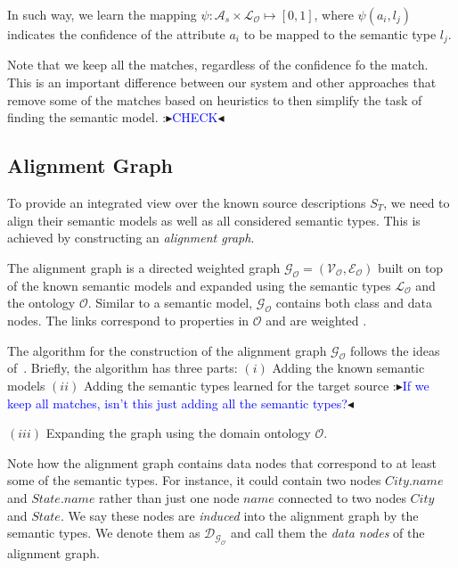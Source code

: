 \documentclass[letterpaper]{article} %
\newcommand{\authornote}[3]{
  {\fbox{\sc 
  #1}:$\blacktriangleright$\textcolor{#2}{\small{#3}}$\blacktriangleleft$}%
}
\newcommand{\ddg}[1]{\authornote{DDG}{blue}{#1}}
\newcommand{\npr}[1]{\authornote{NPR}{orange}{#1}}
\begin{document}
In such way, we learn the mapping $\psi : \mathcal{A}_s \times \mathcal{L_O} 
\mapsto [0, 1]$,
where $\psi(a_i,l_j)$ indicates the confidence of the attribute $a_i$ to be 
mapped to the semantic type $l_j$.

Note that we keep all the matches, regardless of the confidence fo the match. 
This is an important difference between our system and other approaches 
\cite{taheriyan2016learning} that 
remove some of the matches based on heuristics to then simplify the task of 
finding the semantic model. \ddg{CHECK}



\subsection{Alignment Graph}

To provide an integrated view over the known source descriptions $S_T$, we 
need to align their semantic models as well as all considered semantic 
types. 
This is achieved by constructing an \emph{alignment graph}. 

The alignment graph is a directed weighted graph $\mathcal{G_O} = 
(\mathcal{V_O},\mathcal{E_O})$ built on top 
of the known semantic models and expanded using the semantic types 
$\mathcal{L_O}$ and the ontology $\mathcal{O}$. 
Similar to a semantic 
model, $\mathcal{G_O}$ contains both class and data nodes.
The links correspond 
to properties in  $\mathcal{O}$ and are weighted \cite{taheriyan2016learning}.

The algorithm for the construction of the alignment graph $\mathcal{G_O}$ follows the ideas of~\cite{taheriyan2016learning}.
Briefly, the algorithm has three parts:
$(i)$ %
Adding the known semantic models
$(ii)$ %
Adding the semantic types learned for the target source \ddg{If we keep 
all matches, isn't this just adding all the semantic types?}
$(iii)$ Expanding the graph using the domain ontology $\mathcal{O}$.

Note how the alignment graph contains data nodes that correspond to at least 
some of the semantic types. 
For instance, it could contain two nodes $City.name$ and $State.name$ rather than just one node $name$ connected to two 
nodes $City$ and $State$. 
We say these nodes are \emph{induced} into the 
alignment graph by the semantic types.
We denote them as $\mathcal{D_{G_O}}$ and call them the \emph{data nodes} of the alignment graph.
\end{document}
